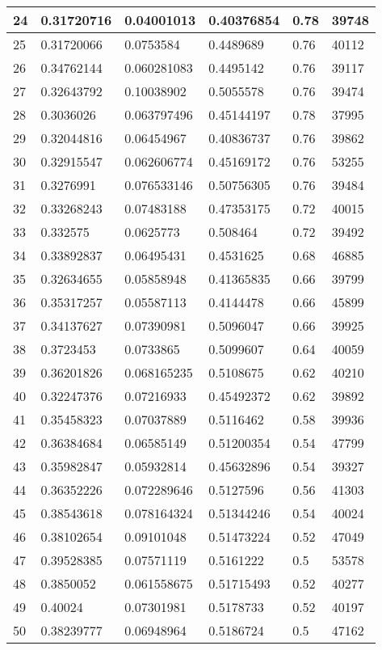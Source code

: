 \begin{longtable}{|l|l|l|l|l|l|}
24 & 0.31720716 & 0.04001013 & 0.40376854 & 0.78 & 39748 \\ \hline 
25 & 0.31720066 & 0.0753584 & 0.4489689 & 0.76 & 40112 \\ \hline 
26 & 0.34762144 & 0.060281083 & 0.4495142 & 0.76 & 39117 \\ \hline 
27 & 0.32643792 & 0.10038902 & 0.5055578 & 0.76 & 39474 \\ \hline 
28 & 0.3036026 & 0.063797496 & 0.45144197 & 0.78 & 37995 \\ \hline 
29 & 0.32044816 & 0.06454967 & 0.40836737 & 0.76 & 39862 \\ \hline 
30 & 0.32915547 & 0.062606774 & 0.45169172 & 0.76 & 53255 \\ \hline 
31 & 0.3276991 & 0.076533146 & 0.50756305 & 0.76 & 39484 \\ \hline 
32 & 0.33268243 & 0.07483188 & 0.47353175 & 0.72 & 40015 \\ \hline 
33 & 0.332575 & 0.0625773 & 0.508464 & 0.72 & 39492 \\ \hline 
34 & 0.33892837 & 0.06495431 & 0.4531625 & 0.68 & 46885 \\ \hline 
35 & 0.32634655 & 0.05858948 & 0.41365835 & 0.66 & 39799 \\ \hline 
36 & 0.35317257 & 0.05587113 & 0.4144478 & 0.66 & 45899 \\ \hline 
37 & 0.34137627 & 0.07390981 & 0.5096047 & 0.66 & 39925 \\ \hline 
38 & 0.3723453 & 0.0733865 & 0.5099607 & 0.64 & 40059 \\ \hline 
39 & 0.36201826 & 0.068165235 & 0.5108675 & 0.62 & 40210 \\ \hline 
40 & 0.32247376 & 0.07216933 & 0.45492372 & 0.62 & 39892 \\ \hline 
41 & 0.35458323 & 0.07037889 & 0.5116462 & 0.58 & 39936 \\ \hline 
42 & 0.36384684 & 0.06585149 & 0.51200354 & 0.54 & 47799 \\ \hline 
43 & 0.35982847 & 0.05932814 & 0.45632896 & 0.54 & 39327 \\ \hline 
44 & 0.36352226 & 0.072289646 & 0.5127596 & 0.56 & 41303 \\ \hline 
45 & 0.38543618 & 0.078164324 & 0.51344246 & 0.54 & 40024 \\ \hline 
46 & 0.38102654 & 0.09101048 & 0.51473224 & 0.52 & 47049 \\ \hline 
47 & 0.39528385 & 0.07571119 & 0.5161222 & 0.5 & 53578 \\ \hline 
48 & 0.3850052 & 0.061558675 & 0.51715493 & 0.52 & 40277 \\ \hline 
49 & 0.40024 & 0.07301981 & 0.5178733 & 0.52 & 40197 \\ \hline 
50 & 0.38239777 & 0.06948964 & 0.5186724 & 0.5 & 47162 \\ \hline 
\end{longtable}